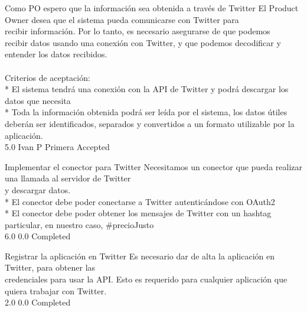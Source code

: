 \vspace{20pt}

	{Como PO espero que la información sea obtenida a través de Twitter} %
	{El Product Owner desea que el sistema pueda comunicarse con Twitter para\\
recibir información. Por lo tanto, es necesario asegurarse de que podemos\\
recibir datos usando una conexión con Twitter, y que podemos decodificar y\\
entender los datos recibidos.\\
  \\
Criterios de aceptación:\\
* El sistema tendrá una conexión con la API de Twitter y podrá descargar los datos que necesita  \\
* Toda la información obtenida podrá ser leída por el sistema, los datos útiles deberán ser identificados, separados y convertidos a un formato utilizable por la aplicación.\\
} %
	{} %
	{5.0} %
	{Ivan P} %
	{Primera} %
	{Accepted} %

		{Implementar el conector para Twitter} %
		{Necesitamos un conector que pueda realizar una llamada al servidor de Twitter\\
y descargar datos.\\
* El conector debe poder conectarse a Twitter autenticándose con OAuth2\\
* El conector debe poder obtener los mensajes de Twitter con un hashtag particular, en nuestro caso, #precioJusto\\
} %
		{6.0} %
		{} %
		{0.0} %
		{Completed} %

		{Registrar la aplicación en Twitter} %
		{Es necesario dar de alta la aplicación en Twitter, para obtener las\\
credenciales para usar la API. Esto es requerido para cualquier aplicación que\\
quiera trabajar con Twitter.\\
} %
		{2.0} %
		{} %
		{0.0} %
		{Completed} %

